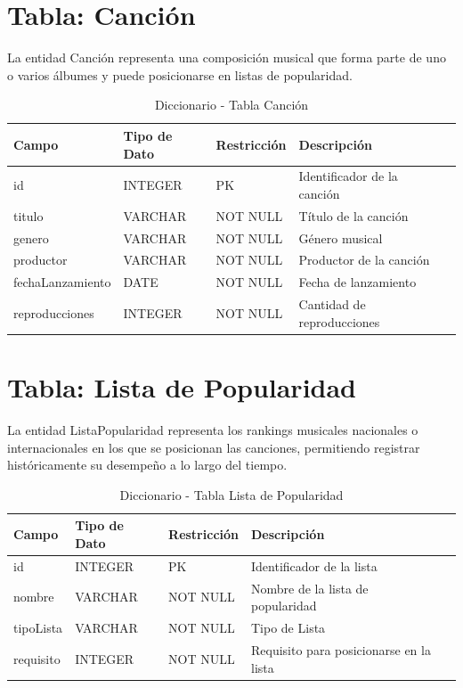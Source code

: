 \documentclass[12pt,a4paper,spanish,oneside]{report}
\begin{document}
\section{Tabla: Canción}
La entidad Canción representa una composición musical que forma parte de uno o varios álbumes y puede posicionarse en listas de popularidad.
\begin{table}[H]
\centering
\caption{Diccionario - Tabla Canción}
\begin{tabular}{|l|l|l|l|l|}
\hline
\textbf{Campo} & \textbf{Tipo de Dato} & \textbf{Restricción} & \textbf{Descripción} \\
\hline
id & INTEGER & PK & Identificador de la canción \\
\hline
titulo & VARCHAR & NOT NULL & Título de la canción \\
\hline
genero & VARCHAR & NOT NULL & Género musical \\
\hline
productor & VARCHAR & NOT NULL & Productor de la canción \\
\hline
fechaLanzamiento & DATE & NOT NULL & Fecha de lanzamiento \\
\hline
reproducciones & INTEGER & NOT NULL & Cantidad de reproducciones \\
\hline
\end{tabular}
\end{table}

\section{Tabla: Lista de Popularidad}
La entidad ListaPopularidad representa los rankings musicales nacionales o internacionales en los que se posicionan las canciones, permitiendo registrar históricamente su desempeño a lo largo del tiempo.
\begin{table}[H]
\centering
\caption{Diccionario - Tabla Lista de Popularidad}
\begin{tabular}{|l|l|l|l|l|}
\hline
\textbf{Campo} & \textbf{Tipo de Dato} & \textbf{Restricción} & \textbf{Descripción} \\
\hline
id & INTEGER & PK & Identificador de la lista \\
\hline
nombre & VARCHAR & NOT NULL & Nombre de la lista de popularidad \\
\hline
tipoLista & VARCHAR & NOT NULL & Tipo de Lista \\
\hline
requisito & INTEGER & NOT NULL & Requisito para posicionarse en la lista \\
\hline
\end{tabular}
\end{table}
\end{document}
